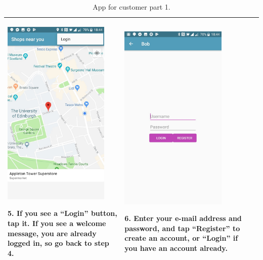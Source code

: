 \documentclass[onecolumn]{IEEEtran}
\begin{document}
\begin{table}[H]
\begin{tabular}{ | m{5.5cm} | m{5.5cm} | m{5.5cm} | }
\begin{minipage}{.31\textwidth}
      \includegraphics[width=\linewidth, height=90mm]{five.jpg}
    \end{minipage}
    5. If you see a “Login” button, tap it. If you see a welcome message, you are already logged in, so go back to step 4.
    & 
    \begin{minipage}{.31\textwidth}
      \includegraphics[width=\linewidth, height=90mm]{six.jpg}
    \end{minipage}
    6. Enter your e-mail address and password, and tap “Register” to create an account, or “Login” if you have an account already.
    \\ \hline
  \end{tabular}
  \caption{App for customer part 1.}\label{tbl:myLboro}
\end{table}
\end{document}

